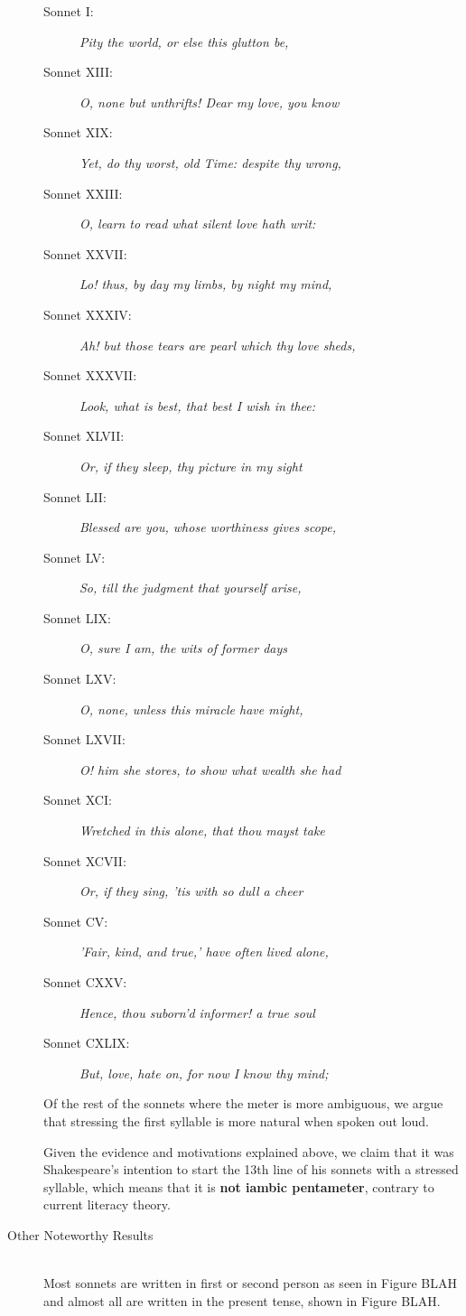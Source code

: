 \begin{description}
\begin{description}
\item[Sonnet I: ] \textit{Pity the world, or else this glutton be,}
\item[Sonnet XIII: ] \textit{O, none but unthrifts! Dear my love, you know}
\item[Sonnet XIX: ] \textit{Yet, do thy worst, old Time: despite thy wrong,}
\item[Sonnet XXIII: ] \textit{O, learn to read what silent love hath writ:}
\item[Sonnet XXVII: ] \textit{Lo! thus, by day my limbs, by night my mind,}
\item[Sonnet XXXIV: ] \textit{Ah! but those tears are pearl which thy love sheds,}
\item[Sonnet XXXVII: ] \textit{Look, what is best, that best I wish in thee:}
\item[Sonnet XLVII: ] \textit{Or, if they sleep, thy picture in my sight}
\item[Sonnet LII: ] \textit{Blessed are you, whose worthiness gives scope,}
\item[Sonnet LV: ] \textit{So, till the judgment that yourself arise,}
\item[Sonnet LIX: ] \textit{O, sure I am, the wits of former days}
\item[Sonnet LXV: ] \textit{O, none, unless this miracle have might,}
\item[Sonnet LXVII: ] \textit{O! him she stores, to show what wealth she had}
\item[Sonnet XCI: ] \textit{Wretched in this alone, that thou mayst take}
\item[Sonnet XCVII: ] \textit{Or, if they sing, 'tis with so dull a cheer}
\item[Sonnet CV: ] \textit{'Fair, kind, and true,' have often lived alone,}
\item[Sonnet CXXV: ] \textit{Hence, thou suborn'd informer! a true soul}
\item[Sonnet CXLIX: ] \textit{But, love, hate on, for now I know thy mind;}
\end{description}

Of the rest of the sonnets where the meter is more ambiguous, we argue that stressing the first syllable is more natural when spoken out loud.

Given the evidence and motivations explained above, we claim that it was Shakespeare's intention to start the 13th line of his sonnets with a stressed syllable, which means that it is \textbf{not iambic pentameter}, contrary to current literacy theory.

\item[Other Noteworthy Results]  \hfill \\
Most sonnets are written in first or second person as seen in Figure BLAH and almost all are written in the present tense, shown in Figure BLAH.
\end{description}


